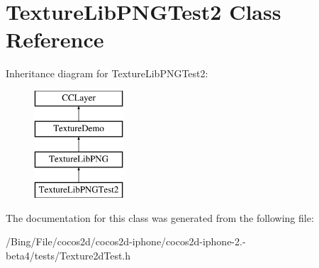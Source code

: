 \hypertarget{interface_texture_lib_p_n_g_test2}{\section{Texture\-Lib\-P\-N\-G\-Test2 Class Reference}
\label{interface_texture_lib_p_n_g_test2}
}
Inheritance diagram for Texture\-Lib\-P\-N\-G\-Test2\-:\begin{figure}[H]
\begin{center}
\leavevmode
\includegraphics[height=4.000000cm]{interface_texture_lib_p_n_g_test2}
\end{center}
\end{figure}


The documentation for this class was generated from the following file\-:\begin{DoxyCompactItemize}
\item 
/\-Bing/\-File/cocos2d/cocos2d-\/iphone/cocos2d-\/iphone-\/2.-\/beta4/tests/Texture2d\-Test.\-h\end{DoxyCompactItemize}
